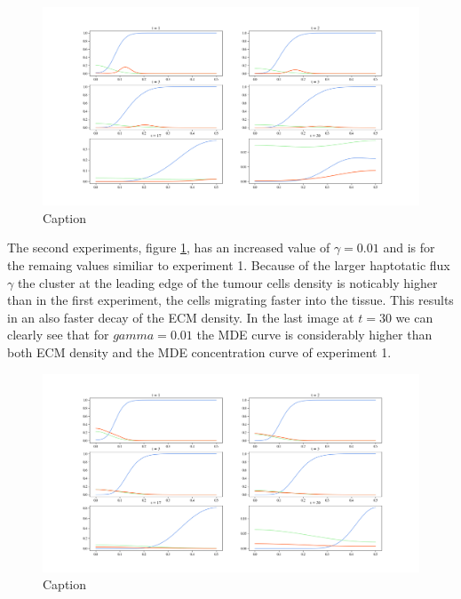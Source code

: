 \begin{figure}
    \centering
    \includegraphics[width=\textwidth]{resources/images/0.001_0.001_0.001_10_0.1_0_0.01_0_0.png}
    \caption{Caption}
    \label{fig:0.001_0.001_0.001_10_0.1_0_0.01_0_0}
\end{figure}

The second experiments, figure \ref{fig:0.001_0.001_0.001_10_0.1_0_0.01_0_0}, has an increased value of $\gamma = 0.01$ and is for the remaing values similiar to experiment 1. Because of the larger haptotatic flux $\gamma$ the cluster at the leading edge of the tumour cells density is noticably higher than in the first experiment, the cells migrating faster into the tissue. This results in an also faster decay of the ECM density. In the last image at $t = 30$ we can clearly see that for $gamma = 0.01$ the MDE curve is considerably higher than both ECM density and the MDE concentration curve of experiment 1. 

\begin{figure}
    \centering
    \includegraphics[width=\textwidth]{resources/images/0.001_0.001_0.001_10_0.1_0_0.001_0_0.png}
    \caption{Caption}
    \label{fig:0.001_0.001_0.001_10_0.1_0_0.001_0_0}
\end{figure}

